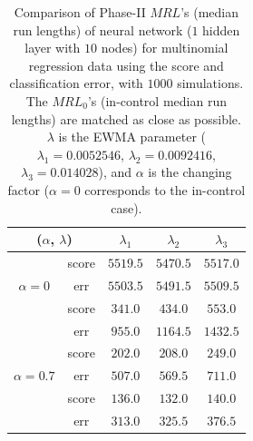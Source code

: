 \documentclass[twoside,11pt]{article}
\begin{document}
\begin{appendix}
\begin{table}[H]
\centering
\begin{tabular}{ccccc}
\toprule
\multicolumn{2}{c}{($ \alpha$, $ \lambda$)} & {$ \lambda_1$} & {$ \lambda_2$} & {$ \lambda_3$} \\
\midrule
\multirow{3}{*}{$\alpha=0$} & score &$5519.5$ & $5470.5$ & $5517.0$ \\
& err &$5503.5$ & $5491.5$ & $5509.5$ \\
\midrule
\multirow{3}{*}{$\alpha=0.5$} & score &$ \bm{341.0}$ & $\bm{434.0}$ & $\bm{553.0}$ \\
& err &$955.0$ & $1164.5$ & $1432.5$ \\
\midrule
\multirow{3}{*}{$\alpha=0.7$} & score &$\bm{202.0}$ & $\bm{208.0}$ & $\bm{249.0}$ \\
& err &$507.0$ & $569.5$ & $711.0$ \\
\midrule
\multirow{3}{*}{$\alpha=0.9$} & score &$\bm{136.0}$ & $\bm{132.0}$ & $\bm{140.0}$ \\
& err &$313.0$ & $325.5$ & $376.5$ \\
\midrule
\end{tabular}
\caption{Comparison of Phase-II $MRL$'s (median run lengths) of neural network ($1$ hidden layer with $10$ nodes) for multinomial regression data using the score and classification error, with $1000$ simulations. The $MRL_0$'s (in-control median run lengths) are matched as close as possible. $ \lambda$ is the EWMA parameter ({$ \lambda_1 =0.0052546$}, {$ \lambda_2=0.0092416$}, {$ \lambda_3 =0.014028$}), and $ \alpha$ is the changing factor ($ \alpha=0$ corresponds to the in-control case).}
\label{tab:multi_logi_nnet_MRL}
\end{table}



\end{appendix}
\end{document}
